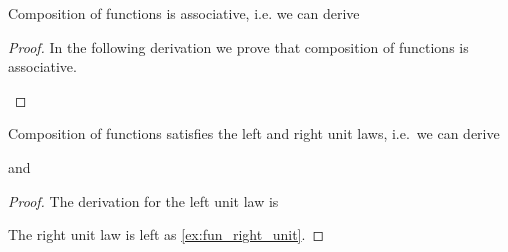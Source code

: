 \begin{lem}
Composition of functions is associative, i.e. we can derive
\begin{prooftree}
\end{prooftree}
\end{lem}

\begin{proof}
In the following derivation we prove that composition of functions is associative.
\begin{prooftree}
\end{prooftree}
\end{proof}

\begin{lem}\label{lem:fun_unit}
Composition of functions satisfies the left and right unit laws, i.e.~we can derive
\begin{prooftree}
\end{prooftree}
and
\begin{prooftree}
\end{prooftree}
\end{lem}

\begin{proof}
The derivation for the left unit law is
\begin{prooftree}
\end{prooftree}
The right unit law is left as \autoref{ex:fun_right_unit}.
\end{proof}

